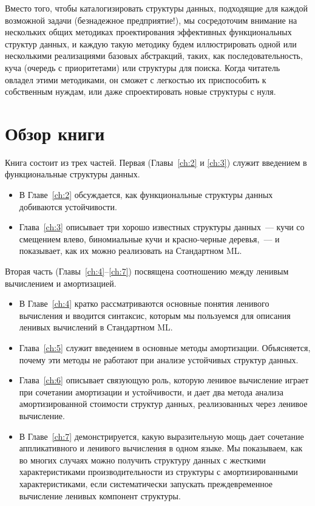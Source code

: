 Вместо того, чтобы каталогизировать структуры данных, подходящие для каждой
возможной задачи (безнадежное предприятие!), мы сосредоточим внимание на нескольких
общих методиках проектирования эффективных функциональных структур
данных, и каждую такую методику будем иллюстрировать одной или
несколькими реализациями базовых абстракций, таких, как
последовательность, куча (очередь с приоритетами) или структуры для
поиска.  Когда читатель овладел этими методиками, он сможет с
легкостью их приспособить к собственным нуждам, или даже
спроектировать новые структуры с нуля.

\section{Обзор книги}

Книга состоит из трех частей. Первая (Главы~\ref{ch:2} и \ref{ch:3})
служит введением в функциональные структуры данных.
\begin{itemize}
\item В Главе~\ref{ch:2} обсуждается, как функциональные структуры
  данных добиваются устойчивости.
\item Глава~\ref{ch:3} описывает три хорошо известных структуры
  данных~--- кучи со смещением влево,
  биномиальные кучи и красно-черные деревья,~--- и показывает, как их
  можно реализовать на Стандартном ML.
\end{itemize}
Вторая часть (Главы~\ref{ch:4}--\ref{ch:7}) посвящена соотношению
между ленивым вычислением и амортизацией.
\begin{itemize}
\item В Главе~\ref{ch:4} кратко рассматриваются основные понятия
  ленивого вычисления и вводится синтаксис, которым мы пользуемся для
  описания ленивых вычислений в Стандартном ML.
\item Глава~\ref{ch:5} служит введением в основные методы
  амортизации. Объясняется, почему эти методы не работают при
  анализе устойчивых структур данных.
\item Глава~\ref{ch:6} описывает связующую роль, которую ленивое
  вычисление играет при сочетании амортизации и устойчивости, и дает
  два метода анализа амортизированной стоимости структур данных,
  реализованных через ленивое вычисление.
\item В Главе~\ref{ch:7} демонстрируется, какую выразительную мощь дает
  сочетание аппликативного и ленивого вычисления в одном языке.
  Мы показываем, как во многих случаях можно получить структуру данных
  с жесткими характеристиками производительности из структуры с
  амортизированными характеристиками, если систематически запускать
  преждевременное вычисление ленивых компонент структуры.
\end{itemize}
